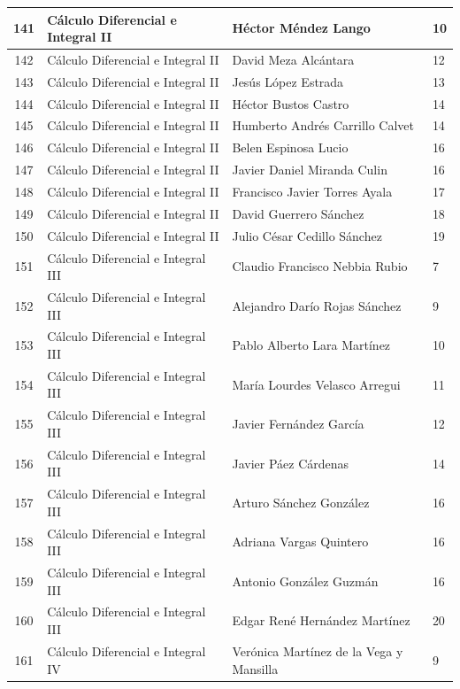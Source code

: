 {\begin{longtable}{|c|p{6.5cm}|p{5cm}|p{1.5cm}|}
  141 & Cálculo Diferencial e Integral II & Héctor Méndez Lango & 10 \\ \hline 
  142 & Cálculo Diferencial e Integral II & David Meza Alcántara & 12 \\ \hline 
  143 & Cálculo Diferencial e Integral II & Jesús López Estrada & 13 \\ \hline 
  144 & Cálculo Diferencial e Integral II & Héctor Bustos Castro & 14 \\ \hline 
  145 & Cálculo Diferencial e Integral II & Humberto Andrés Carrillo Calvet & 14 \\ \hline 
  146 & Cálculo Diferencial e Integral II & Belen Espinosa Lucio & 16 \\ \hline 
  147 & Cálculo Diferencial e Integral II & Javier Daniel Miranda Culin & 16 \\ \hline 
  148 & Cálculo Diferencial e Integral II & Francisco Javier Torres Ayala & 17 \\ \hline 
  149 & Cálculo Diferencial e Integral II & David Guerrero Sánchez & 18 \\ \hline 
  150 & Cálculo Diferencial e Integral II & Julio César Cedillo Sánchez & 19 \\ \hline 
  151 & Cálculo Diferencial e Integral III & Claudio Francisco Nebbia Rubio & 7 \\ \hline 
  152 & Cálculo Diferencial e Integral III & Alejandro Darío Rojas Sánchez & 9 \\ \hline 
  153 & Cálculo Diferencial e Integral III & Pablo Alberto Lara Martínez & 10 \\ \hline 
  154 & Cálculo Diferencial e Integral III & María Lourdes Velasco Arregui & 11 \\ \hline 
  155 & Cálculo Diferencial e Integral III & Javier Fernández García & 12 \\ \hline 
  156 & Cálculo Diferencial e Integral III & Javier Páez Cárdenas & 14 \\ \hline 
  157 & Cálculo Diferencial e Integral III & Arturo Sánchez González & 16 \\ \hline 
  158 & Cálculo Diferencial e Integral III & Adriana Vargas Quintero & 16 \\ \hline 
  159 & Cálculo Diferencial e Integral III & Antonio González Guzmán & 16 \\ \hline 
  160 & Cálculo Diferencial e Integral III & Edgar René Hernández Martínez & 20 \\ \hline 
  161 & Cálculo Diferencial e Integral IV & Verónica Martínez de la Vega y Mansilla & 9 \\ \hline 

\end{longtable}}
